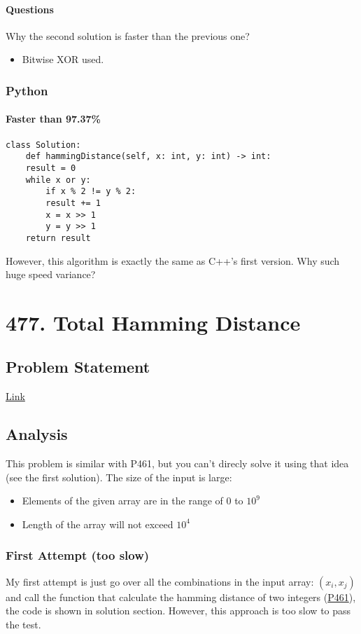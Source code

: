 \documentclass[12pt]{book}
\begin{document}
\subsubsection{Questions}
\label{sec:orgc549374}
Why the second solution is faster than the previous one?
\begin{itemize}
\item Bitwise XOR used.
\end{itemize}
\subsection{Python}
\label{sec:orgf706170}
\subsubsection{Faster than 97.37\%}
\label{sec:orgb658cbe}
\begin{verbatim}
class Solution:
    def hammingDistance(self, x: int, y: int) -> int:
	result = 0
	while x or y:
	    if x % 2 != y % 2:
		result += 1
	    x = x >> 1
	    y = y >> 1
	return result
\end{verbatim}
However, this algorithm is exactly the same as C++'s first version. Why such huge speed variance?
\chapter{477. Total Hamming Distance}
\label{sec:org9cf8d0e}
\section{Problem Statement}
\label{sec:org929c7bb}
\href{https://leetcode.com/problems/total-hamming-distance/}{Link}
\section{Analysis}
\label{sec:org8197482}
This problem is similar with P461, but you can't direcly solve it using that idea (see the first solution). The size of the input is large:
\begin{itemize}
\item Elements of the given array are in the range of \(0\) to \(10^9\)
\item Length of the array will not exceed \(10^4\)
\end{itemize}

\subsection{First Attempt (too slow)}
\label{sec:orgcee87f0}
My first attempt is just go over all the combinations in the input array: \((x_i, x_j)\) and call the function that calculate the hamming distance of two integers (\hyperref[org7e98d91]{P461}), the code is shown in solution section. However, this approach is too slow to pass the test.
\end{document}
